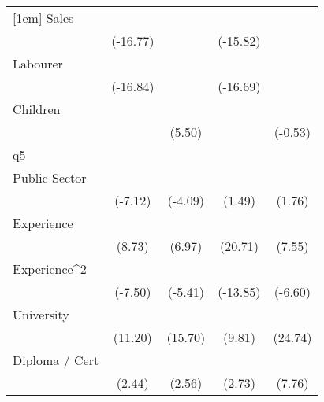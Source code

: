 {\begin{tabular}{l*{4}{c}}
[1em]
Sales               &            \sym{***}&                     &            \sym{***}&                     \\
                    &    (-16.77)         &                     &    (-15.82)         &                     \\
[1em]
Labourer            &            \sym{***}&                     &            \sym{***}&                     \\
                    &    (-16.84)         &                     &    (-16.69)         &                     \\
[1em]
Children            &                     &            \sym{***}&                     &                     \\
                    &                     &      (5.50)         &                     &     (-0.53)         \\
\hline
q5                  &                     &                     &                     &                     \\
Public Sector       &            \sym{***}&            \sym{***}&                     &                     \\
                    &     (-7.12)         &     (-4.09)         &      (1.49)         &      (1.76)         \\
[1em]
Experience          &            \sym{***}&            \sym{***}&            \sym{***}&            \sym{***}\\
                    &      (8.73)         &      (6.97)         &     (20.71)         &      (7.55)         \\
[1em]
Experience^{2}      &            \sym{***}&            \sym{***}&            \sym{***}&            \sym{***}\\
                    &     (-7.50)         &     (-5.41)         &    (-13.85)         &     (-6.60)         \\
[1em]
University          &            \sym{***}&            \sym{***}&            \sym{***}&            \sym{***}\\
                    &     (11.20)         &     (15.70)         &      (9.81)         &     (24.74)         \\
[1em]
Diploma / Cert      &            \sym{*}  &            \sym{*}  &            \sym{**} &            \sym{***}\\
                    &      (2.44)         &      (2.56)         &      (2.73)         &      (7.76)         \\

\end{tabular}}
